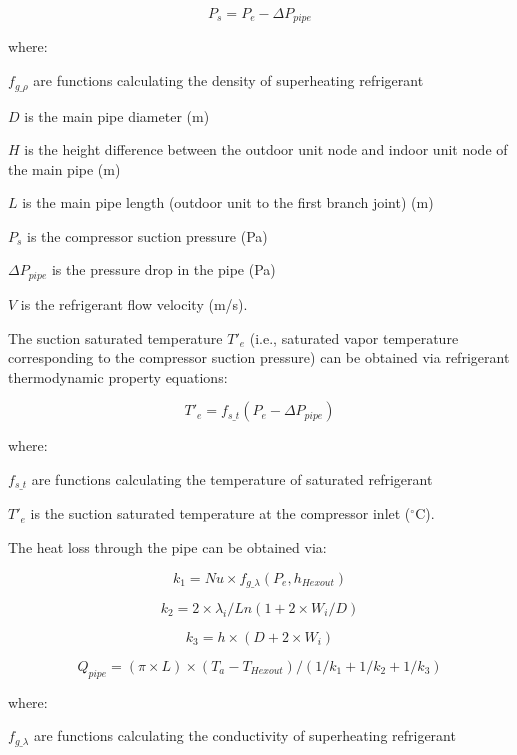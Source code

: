 \begin{equation}
  P_s=P_e-\Delta{P_{pipe}}
\end{equation}

where:

$f_{g\_\rho}$ are functions calculating the density of superheating refrigerant

$D$ is the main pipe diameter (m)

$H$ is the height difference between the outdoor unit node and indoor unit node of the main pipe (m)

$L$ is the main pipe length (outdoor unit to the first branch joint) (m)

$P_s$ is the compressor suction pressure (Pa)

$\Delta{P_{pipe}}$ is the pressure drop in the pipe (Pa)

$V$ is the refrigerant flow velocity (m/s).

The suction saturated temperature $T'_e$ (i.e., saturated vapor temperature corresponding to the compressor suction pressure) can be obtained via refrigerant thermodynamic property equations:

\begin{equation}
  T'_e=f_{s\_t}(P_e-\Delta{P_{pipe}})
\end{equation}

where:

$f_{s\_t}$ are functions calculating the temperature of saturated refrigerant

$T'_e$ is the suction saturated temperature at the compressor inlet (\(^{\circ}\)C).

The heat loss through the pipe can be obtained via:

\begin{equation}
k_1=Nu\times{f_{g\_\lambda}(P_e,h_{Hexout})}
\end{equation}

\begin{equation}k_2=2\times{\lambda_i}/Ln(1+2\times{W_i}/D)\end{equation}

\begin{equation}k_3=h\times(D+2\times{W_i})\end{equation}

\begin{equation}Q_{pipe}=(\pi\times{L})\times(T_a-T_{Hexout})/(1/k_1+1/k_2+1/k_3)\end{equation}

where:

$f_{g\_\lambda}$ are functions calculating the conductivity of superheating refrigerant

